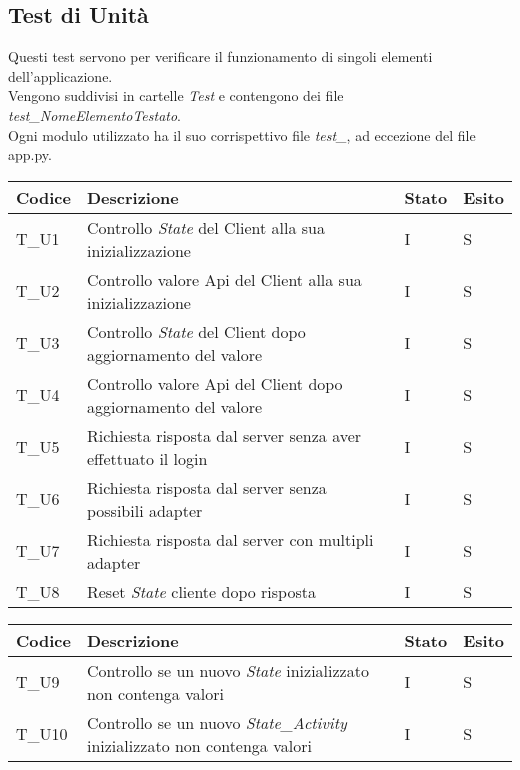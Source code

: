 \subsection{Test di Unità}
Questi test servono per verificare il funzionamento di singoli elementi dell'applicazione.  \\
Vengono suddivisi in cartelle \textit{Test} e contengono dei file \textit{test\_NomeElementoTestato}. \\
Ogni modulo utilizzato ha il suo corrispettivo file \textit{test\_}, ad eccezione del file app.py.
\begin{center}
  \renewcommand{\arraystretch}{1.8}
  \begin{tabular}{ |m{3em}|m{26em}|m{3em}|m{3em}| }
      \hline
      \textbf{Codice} & \textbf{Descrizione}  & \textbf{Stato} & \textbf{Esito}\\
      \hline
      T\_U1 & Controllo \textit{State} del Client alla sua inizializzazione & I & S \\
      \hline
      T\_U2 & Controllo valore Api del Client alla sua inizializzazione & I & S \\
      \hline
      T\_U3 & Controllo \textit{State} del Client dopo aggiornamento del valore & I & S \\
      \hline
      T\_U4 & Controllo valore Api del Client dopo aggiornamento del valore & I & S \\
      \hline
      T\_U5 & Richiesta risposta dal server senza aver effettuato il login & I & S \\
      \hline
      T\_U6 & Richiesta risposta dal server senza possibili adapter & I & S \\
      \hline
      T\_U7 & Richiesta risposta dal server con multipli adapter & I & S \\
      \hline
      T\_U8 & Reset \textit{State} cliente dopo risposta & I & S \\
      \hline
  \end{tabular}
  \newpage
  \begin{tabular}{ |m{3em}|m{23em}|m{3em}|m{3em}| }
    \hline
    \textbf{Codice} & \textbf{Descrizione}  & \textbf{Stato} & \textbf{Esito}\\
    \hline
      T\_U9 & Controllo se un nuovo \textit{State} inizializzato non contenga valori  & I & S \\
      \hline
      T\_U10 & Controllo se un nuovo \textit{State\_Activity} inizializzato non contenga valori  & I & S\\
      \hline

\end{tabular}
\end{center}
